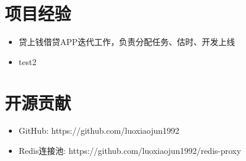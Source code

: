 \documentclass[a4paper,12pt]{article}
\begin{document}
\begin{CJK}{UTF8}{gbsn}
		\section{项目经验}
			\begin{itemize}
				\item{贷上钱借贷APP迭代工作，负责分配任务、估时、开发上线}
				\item{test2}
			\end{itemize}
		
		\section{开源贡献}
		 	\begin{itemize}
				\item{GitHub: https://github.com/luoxiaojun1992}
				\item{Redis连接池: https://github.com/luoxiaojun1992/redis-proxy}
			\end{itemize}	

	\end{CJK}
\end{document}
